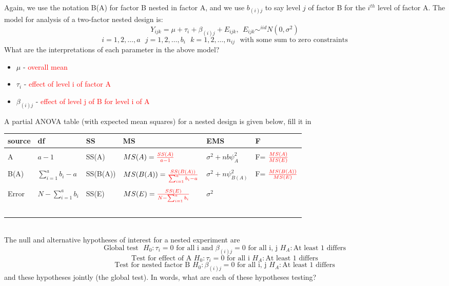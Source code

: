 \newpage

Again, we use the notation B(A) for factor B nested in factor A, and we use $b_{(i)j}$ to say level $j$ of factor B for the $i^{th}$ level of factor A.  The model for analysis of a two-factor nested design is:
$$Y_{ijk}=\mu+\tau_i+\beta_{(i)j}+E_{ijk},~~E_{ijk}\sim^{iid} N(0,\sigma^2)$$
$$i=1,2,\ldots,a ~~~j=1,2,\ldots,b_{i} ~~~k=1,2,\ldots,n_{ij}~~~\mbox{with some sum to zero constraints}$$
What are the interpretations of each parameter in the above model?
\begin{itemize}
\item $\mu$ - \textcolor{red}{overall mean}
\item $\tau_i$ - \textcolor{red}{effect of level i of factor A}
\item $\beta_{(i)j}$ - \textcolor{red}{effect of level j of B for level i of A}\\
\end{itemize}
A partial ANOVA table (with expected mean squares) for a nested design is given below, fill it in\\
\begin{tabular}{l|lllll}
source& df &SS & MS & EMS & F\\
\hline
&&&&&\\
A & $a-1$ & SS(A) & $MS(A)=%
\textcolor{red}{\frac{SS(A)}{a-1}}
$&$\sigma^2+nb\psi^2_A$& F=
$\textcolor{red}{\frac{MS(A)}{MS(E)}}$
\\
&&&&&\\
B(A) & $\sum_{i=1}^{a}b_{i}-a$ & SS(B(A)) & $MS(B(A))=%
\textcolor{red}{\frac{SS(B(A))}{\sum_{i=1}^{a}b_{i}-a}}
$&$\sigma^2+n\psi^2_{B(A)}$&F=
$\textcolor{red}{\frac{MS(B(A))}{MS(E)}}$
\\
&&&&&\\
Error & $N-\sum_{i=1}^{a}b_i$& SS(E)& $MS(E)=%
\textcolor{red}{\frac{SS(E)}{N-\sum_{i=1}^{a}b_i}}
$&$\sigma^2$\\~\\
\end{tabular}\\
The null and alternative hypotheses of interest for a nested experiment are 
$$\mbox{Global test~~} H_0:\tau_i=0 \mbox{ for all i and }\beta_{(i)j}=0\mbox{ for all i, j     }H_A: \mbox{At least 1 differs}$$
$$\mbox{Test for effect of A } H_0:\tau_i=0 \mbox{ for all i   } H_A: \mbox{At least 1 differs}$$
$$\mbox{Test for nested factor B }H_0:\beta_{(i)j}=0\mbox{ for all i, j     } H_A: \mbox{At least 1 differs}$$
and these hypotheses jointly (the global test).  In words, what are each of these hypotheses testing?\\~\\%
